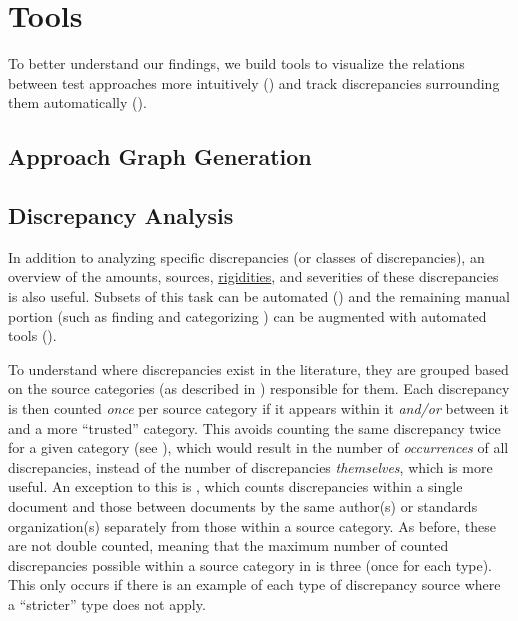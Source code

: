 \section{Tools}
\label{tools}

\newcommand{\autoDiscreps}[1][,]{discrepancies in \Cref{syns,par-rels},
    including \Cref{tab:parSyns}#1}

To better understand our findings, we build tools to visualize the
relations between test approaches more intuitively () and track
discrepancies surrounding them automatically ().

\subsection{Approach Graph Generation}
\label{graph-gen}

\graphGenDesc{}

\subsection{Discrepancy Analysis}
\label{discrep-analysis}

In addition to analyzing specific discrepancies (or classes of discrepancies),
an overview of the amounts, sources, \hyperref[rigidity]{rigidities}, and
severities of these discrepancies is also
useful. Subsets of this task can be automated ()
and the remaining manual portion (such as finding and categorizing
) can be augmented with automated
tools ().

To understand where discrepancies exist in the literature, they are
grouped based on the source categories (as described in )
responsible for them. Each discrepancy is then counted \emph{once} per source
category if it appears within it \emph{and/or} between it and a more
``trusted'' category.
This avoids counting the same discrepancy twice for a given category (see
), which would result in the number of
\emph{occurrences} of all discrepancies, instead of the number of discrepancies
\emph{themselves}, which is more useful. An exception to this is
, which counts discrepancies within a single document
and those between documents by the same author(s) or standards organization(s)
separately from those within a source category. As before, these are not double
counted, meaning that the maximum number of counted discrepancies possible
within a source category in  is three (once for each
type). This only occurs if there is an example of each type of discrepancy
source where a ``stricter'' type does not apply.

